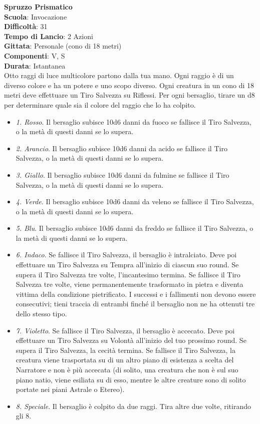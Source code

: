 \begin{multicols}{2}
\medskip\textbf{Spruzzo Prismatico}\\
\textbf{Scuola}: Invocazione\\
\textbf{Difficoltà}: 31\\
\textbf{Tempo di Lancio}: 2 Azioni\\
\textbf{Gittata}: Personale (cono di 18 metri)\\
\textbf{Componenti}: V, S\\
\textbf{Durata}: Istantanea\\
Otto raggi di luce multicolore partono dalla tua mano. Ogni raggio è di un diverso colore e ha un potere e uno scopo diverso. Ogni creatura in un cono di 18 metri deve effettuare un Tiro Salvezza su Riflessi. Per ogni bersaglio, tirare un d8 per determinare quale sia il colore del raggio che lo ha colpito.\\
\medskip
\begin{itemize}
\item
\textit{1. Rosso}. Il bersaglio subisce 10d6 danni da fuoco se fallisce il Tiro Salvezza, o la metà di questi danni se lo supera.
\item
\textit{2. Arancio}. Il bersaglio subisce 10d6 danni da acido se fallisce il Tiro Salvezza, o la metà di questi danni se lo supera.
\item
\textit{3. Giallo}. Il bersaglio subisce 10d6 danni da fulmine se fallisce il Tiro Salvezza, o la metà di questi danni se lo supera.
\item
\textit{4. Verde}. Il bersaglio subisce 10d6 danni da veleno se fallisce il Tiro Salvezza, o la metà di questi danni se lo supera.
\item
\textit{5. Blu}. Il bersaglio subisce 10d6 danni da freddo se fallisce il Tiro Salvezza, o la metà di questi danni se lo supera.
\item
\textit{6. Indaco}. Se fallisce il Tiro Salvezza, il bersaglio è intralciato. Deve poi effettuare un Tiro Salvezza su Tempra all'inizio di ciascun suo round. Se supera il Tiro Salvezza tre volte, l'incantesimo termina. Se fallisce il Tiro Salvezza tre volte, viene permanentemente trasformato in pietra e diventa vittima della condizione pietrificato. I successi e i fallimenti non devono essere consecutivi; tieni traccia di entrambi finché il bersaglio non ne ha ottenuti tre dello stesso tipo.
\item
\textit{7. Violetto}. Se fallisce il Tiro Salvezza, il bersaglio è accecato. Deve poi effettuare un Tiro Salvezza su Volontà all'inizio del tuo prossimo round. Se supera il Tiro Salvezza, la cecità termina. Se fallisce il Tiro Salvezza, la creatura viene trasportata su di un altro piano di esistenza a scelta del Narratore e non è più accecata (di solito, una creatura che non è sul suo piano natio, viene esiliata su di esso, mentre le altre creature sono di solito portate nei piani Astrale o Etereo).
\item
\textit{8. Speciale}. Il bersaglio è colpito da due raggi. Tira altre due volte, ritirando gli 8.
\end{itemize}


\end{multicols}
